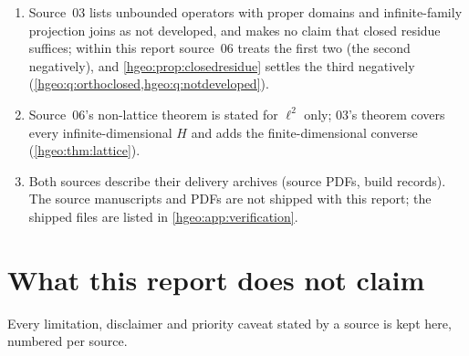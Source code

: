\documentclass[11pt,letterpaper]{article}
\numberwithin{equation}{section}
\theoremstyle{definition}
\theoremstyle{remark}
\newcommand{\replabel}[1]{\nolinkurl{#1}}
\begin{document}
\begin{enumerate}[leftmargin=*]
the labels \replabel{ihs:hh:thm:adjoint}, \replabel{ihs:hh:thm:coercive},
\replabel{ihs:hh:thm:norm}, \replabel{duals:prop:spherical},
\replabel{duals:prop:norm}, \replabel{duals:thm:riesz}. Its description of
the spectral report as 99 pages is still that report's page count.
\item Source~03 lists unbounded operators with proper domains and
infinite-family projection joins as not developed, and makes no claim that
closed residue suffices; within this report source~06 treats the first two
(the second negatively), and \cref{hgeo:prop:closedresidue} settles the third
negatively (\cref{hgeo:q:orthoclosed,hgeo:q:notdeveloped}).
\item Source~06's non-lattice theorem is stated for $\ell^2$ only; 03's
theorem covers every infinite-dimensional $H$ and adds the finite-dimensional
converse (\cref{hgeo:thm:lattice}).
\item Both sources describe their delivery archives (source PDFs, build
records). The source manuscripts and PDFs are not shipped with this report;
the shipped files are listed in \cref{hgeo:app:verification}.
\end{enumerate}

\section{What this report does not claim}\label{hgeo:app:nonclaims}
Every limitation, disclaimer and priority caveat stated by a source is kept
here, numbered per source.
\end{document}
